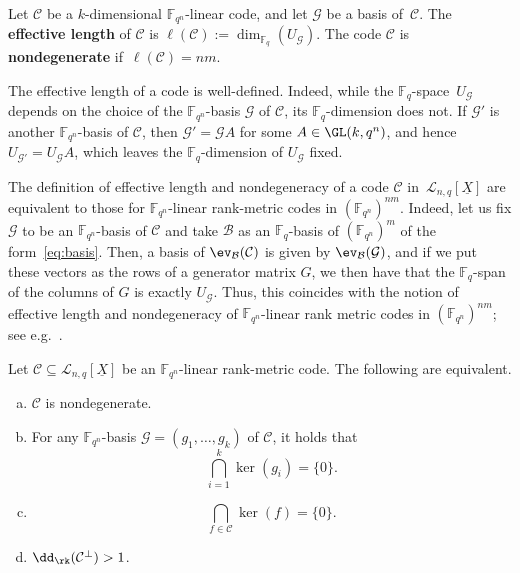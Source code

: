 \begin{defi}
 Let $\mathcal{C}$ be a $k$-dimensional ${\mathbb F}_{q^n}$-linear code, and let $\mathcal{G}$ be a basis of~$\mathcal{C}$.  The  \textbf{effective length} of  $\mathcal{C}$ is $\ell(\mathcal{C}):=\dim_{\mathbb{F}_q}(U_{\mathcal{G}})$. 
The code $\mathcal{C}$ is \textbf{nondegenerate} if~$\ell(\mathcal{C})=nm$. 
\end{defi}

\begin{rema}
 The effective length of a code is well-defined. Indeed, while the $\mathbb{F}_q$-space~$U_{\mathcal{G}}$ depends on the choice of the ${\mathbb F}_{q^n}$-basis $\mathcal{G}$ of $\mathcal{C}$, its $\mathbb{F}_q$-dimension does not. If $\mathcal{G}'$ is another ${\mathbb F}_{q^n}$-basis of $\mathcal{C}$, then ${\mathcal{G}'}={\mathcal{G}}A$ for some $A\in \GL(k,q^n)$, and hence $U_{\mathcal{G}'}=U_{\mathcal{G}}A$, which leaves the $\mathbb{F}_q$-dimension of $U_{\mathcal{G}}$ fixed.  
\end{rema}

\begin{rema}
 The definition of effective length and nondegeneracy of a code $\mathcal{C}$ in~$\mathcal{L}_{n,q}[\underline{X}]$ are equivalent to those for ${\mathbb F}_{q^n}$-linear rank-metric codes in $(\mathbb{F}_{q^n})^{nm}$. Indeed, let us fix $\mathcal{G}$ to be an ${\mathbb F}_{q^n}$-basis of $\mathcal{C}$  and take $\mathcal{B}$ as an $\mathbb{F}_q$-basis of $({\mathbb F}_{q^n})^m$ of the form~\eqref{eq:basis}. Then, a basis of $\ev_{\mathcal{B}}(\mathcal{C})$ is given by $\ev_{\mathcal{B}}(\mathcal{G})$, and if we put these vectors as the rows of a generator matrix $G$, we then have that  the $\mathbb{F}_q$-span of the columns of $G$ is exactly $U_{\mathcal{G}}$. Thus, this coincides with the notion of effective length and nondegeneracy of ${\mathbb F}_{q^n}$-linear rank metric codes in $(\mathbb{F}_{q^n})^{nm}$; see e.g.~\cite{ABNR22}.
\end{rema}

\begin{prop}\label{prop:nondegenerate}
Let $\mathcal{C}\subseteq \mathcal{L}_{n,q}[\underline{X}]$ be an ${\mathbb F}_{q^n}$-linear rank-metric code. The following are equivalent.
 \begin{enumerate}[(a)]
\item  $\mathcal{C}$ is nondegenerate.
\item For any ${\mathbb F}_{q^n}$-basis $\mathcal G=(g_1,\ldots, g_k)$  of $\mathcal{C}$, it holds that $$ \bigcap_{i=1}^k\ker(g_i)=\{0\}.$$
\item $$ \bigcap_{f\in\mathcal{C}}\ker(f)=\{0\}.$$ 
 \item $ \dd_{\rk}(\mathcal{C}^\perp)>1$.
 \end{enumerate}
\end{prop}

